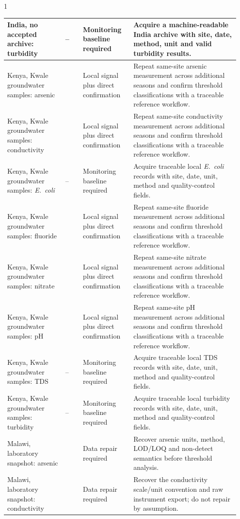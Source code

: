 \documentclass[10pt,letterpaper]{article}
\begin{document}
\begin{spacing}{1}
{\begin{longtable}{>{\raggedright\arraybackslash}p{0.2385\linewidth}>{\raggedleft\arraybackslash}p{0.0769\linewidth}>{\raggedright\arraybackslash}p{0.2077\linewidth}>{\raggedright\arraybackslash}p{0.4262\linewidth}}
India, no accepted archive: turbidity & -- & Monitoring baseline required & Acquire a machine-readable India archive with site, date, method, unit and valid turbidity results. \\ \hline
Kenya, Kwale groundwater samples: arsenic & 140 & Local signal plus direct confirmation & Repeat same-site arsenic measurement across additional seasons and confirm threshold classifications with a traceable reference workflow. \\ \hline
Kenya, Kwale groundwater samples: conductivity & 140 & Local signal plus direct confirmation & Repeat same-site conductivity measurement across additional seasons and confirm threshold classifications with a traceable reference workflow. \\ \hline
Kenya, Kwale groundwater samples: \textit{E.~coli} & -- & Monitoring baseline required & Acquire traceable local \textit{E.~coli} records with site, date, unit, method and quality-control fields. \\ \hline
Kenya, Kwale groundwater samples: fluoride & 139 & Local signal plus direct confirmation & Repeat same-site fluoride measurement across additional seasons and confirm threshold classifications with a traceable reference workflow. \\ \hline
Kenya, Kwale groundwater samples: nitrate & 139 & Local signal plus direct confirmation & Repeat same-site nitrate measurement across additional seasons and confirm threshold classifications with a traceable reference workflow. \\ \hline
Kenya, Kwale groundwater samples: pH & 140 & Local signal plus direct confirmation & Repeat same-site pH measurement across additional seasons and confirm threshold classifications with a traceable reference workflow. \\ \hline
Kenya, Kwale groundwater samples: TDS & -- & Monitoring baseline required & Acquire traceable local TDS records with site, date, unit, method and quality-control fields. \\ \hline
Kenya, Kwale groundwater samples: turbidity & -- & Monitoring baseline required & Acquire traceable local turbidity records with site, date, unit, method and quality-control fields. \\ \hline
Malawi, laboratory snapshot: arsenic & 10 & Data repair required & Recover arsenic units, method, LOD/LOQ and non-detect semantics before threshold analysis. \\ \hline
Malawi, laboratory snapshot: conductivity & 31 & Data repair required & Recover the conductivity scale/unit convention and raw instrument export; do not repair by assumption. \\ \hline

\end{longtable}}
\end{spacing}
\end{document}
